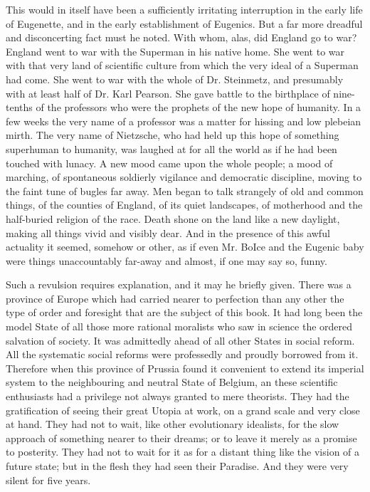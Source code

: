 \documentclass{book}
\begin{document}
This would in itself have been a sufficiently irritating interruption in the early life of Eugenette, and in the early establishment of Eugenics. But a far more dreadful and disconcerting fact must he noted. With whom, alas, did England go to war? England went to war with the Superman in his native home. She went to war with that very land of scientific culture from which the very ideal of a Superman had come. She went to war with the whole of Dr. Steinmetz, and presumably with at least half of Dr. Karl Pearson. She gave battle to the birthplace of nine-tenths of the professors who were the prophets of the new hope of humanity. In a few weeks the very name of a professor was a matter for hissing and low plebeian mirth. The very name of Nietzsche, who had held up this hope of something superhuman to humanity, was laughed at for all the world as if he had been touched with lunacy. A new mood came upon the whole people; a mood of marching, of spontaneous soldierly vigilance and democratic discipline, moving to the faint tune of bugles far away. Men began to talk strangely of old and common things, of the counties of England, of its quiet landscapes, of motherhood and the half-buried religion of the race. Death shone on the land like a new daylight, making all things vivid and visibly dear. And in the presence of this awful actuality it seemed, somehow or other, as if even Mr. BoIce and the Eugenic baby were things unaccountably far-away and almost, if one may say so, funny.

Such a revulsion requires explanation, and it may he briefly given. There was a province of Europe which had carried nearer to perfection than any other the type of order and foresight that are the subject of this book. It had long been the model State of all those more rational moralists who saw in science the ordered salvation of society. It was admittedly ahead of all other States in social reform. All the systematic social reforms were professedly and proudly borrowed from it. Therefore when this province of Prussia found it convenient to extend its imperial system to the neighbouring and neutral State of Belgium, an these scientific enthusiasts had a privilege not always granted to mere theorists. They had the gratification of seeing their great Utopia at work, on a grand scale and very close at hand. They had not to wait, like other evolutionary idealists, for the slow approach of something nearer to their dreams; or to leave it merely as a promise to posterity. They had not to wait for it as for a distant thing like the vision of a future state; but in the flesh they had seen their Paradise. And they were very silent for five years.
\end{document}
